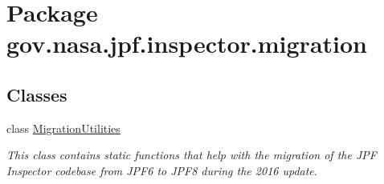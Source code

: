 \hypertarget{namespacegov_1_1nasa_1_1jpf_1_1inspector_1_1migration}{}\section{Package gov.\+nasa.\+jpf.\+inspector.\+migration}
\label{namespacegov_1_1nasa_1_1jpf_1_1inspector_1_1migration}
\subsection*{Classes}
\begin{DoxyCompactItemize}
\item 
class \hyperlink{classgov_1_1nasa_1_1jpf_1_1inspector_1_1migration_1_1_migration_utilities}{Migration\+Utilities}
\begin{DoxyCompactList}\small\item\em This class contains static functions that help with the migration of the J\+PF Inspector codebase from J\+P\+F6 to J\+P\+F8 during the 2016 update. \end{DoxyCompactList}\end{DoxyCompactItemize}
